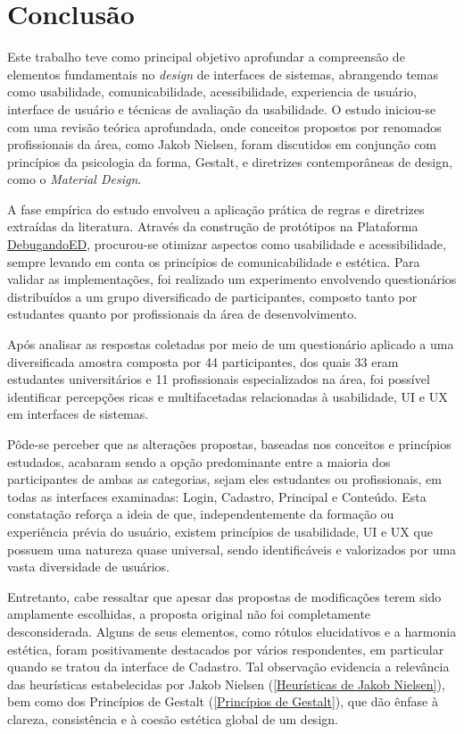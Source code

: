 \chapter[Conclusão]{Conclusão}
\label{capConclusao}

Este trabalho teve como principal objetivo aprofundar a compreensão de elementos fundamentais no \textit{design} de interfaces de sistemas, abrangendo temas como usabilidade, comunicabilidade, acessibilidade, experiencia de usuário, interface de usuário e técnicas de avaliação da usabilidade. O estudo iniciou-se com uma revisão teórica aprofundada, onde conceitos propostos por renomados profissionais da área, como Jakob Nielsen, foram discutidos em conjunção com princípios da psicologia da forma, Gestalt, e diretrizes contemporâneas de design, como o \textit{Material Design}.

A fase empírica do estudo envolveu a aplicação prática de regras e diretrizes extraídas da literatura. Através da construção de protótipos na Plataforma \href{https://debugandoed.facom.ufu.br/}{DebugandoED}, procurou-se otimizar aspectos como usabilidade e acessibilidade, sempre levando em conta os princípios de comunicabilidade e estética. Para validar as implementações, foi realizado um experimento envolvendo questionários distribuídos a um grupo diversificado de participantes, composto tanto por estudantes quanto por profissionais da área de desenvolvimento.

Após analisar as respostas coletadas por meio de um questionário aplicado a uma diversificada amostra composta por 44 participantes, dos quais 33 eram estudantes universitários e 11 profissionais especializados na área, foi possível identificar percepções ricas e multifacetadas relacionadas à usabilidade, \ac{UI} e \ac{UX} em interfaces de sistemas.

Pôde-se perceber que as alterações propostas, baseadas nos conceitos e princípios estudados, acabaram sendo a opção predominante entre a maioria dos participantes de ambas as categorias, sejam eles estudantes ou profissionais, em todas as interfaces examinadas: Login, Cadastro, Principal e Conteúdo. Esta constatação reforça a ideia de que, independentemente da formação ou experiência prévia do usuário, existem princípios de usabilidade, \ac{UI} e \ac{UX} que possuem uma natureza quase universal, sendo identificáveis e valorizados por uma vasta diversidade de usuários.

Entretanto, cabe ressaltar que apesar das propostas de modificações terem sido amplamente escolhidas, a proposta original não foi completamente desconsiderada. Alguns de seus elementos, como rótulos elucidativos e a harmonia estética, foram positivamente destacados por vários respondentes, em particular quando se tratou da interface de Cadastro. Tal observação evidencia a relevância das heurísticas estabelecidas por Jakob Nielsen (\ref{Heurísticas de Jakob Nielsen}), bem como dos  Princípios de Gestalt (\ref{Princípios de Gestalt}), que dão ênfase à clareza, consistência e à coesão estética global de um design.

